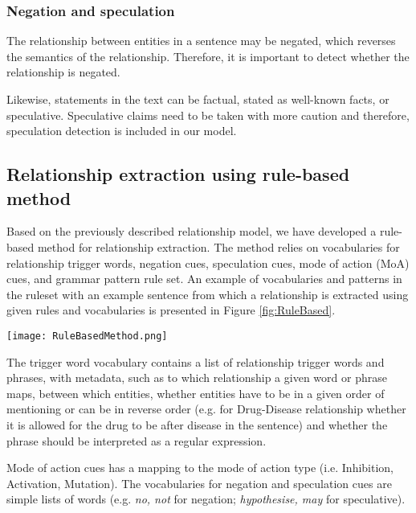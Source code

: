 \documentclass[final,12pt,3p,times,twocolumn,authoryear]{elsarticle}
\begin{document}
\subsubsection{Negation and speculation}

The relationship between entities in a sentence may be negated, which reverses the semantics of the relationship. Therefore, it is important to detect whether the relationship is negated.

Likewise, statements in the text can be factual, stated as well-known facts, or speculative. Speculative claims need to be taken with more caution and therefore, speculation detection is included in our model. 


\subsection{Relationship extraction using rule-based method}

Based on the previously described relationship model, we have developed a rule-based method for relationship extraction. The method relies on vocabularies for relationship trigger words, negation cues, speculation cues, mode of action (MoA) cues, and grammar pattern rule set. An example of vocabularies and patterns in the ruleset with an example sentence from which a relationship is extracted using given rules and vocabularies is presented in Figure \ref{fig:RuleBased}.

  \begin{figure*}[h]
\caption{Example of dictionaries, rules set and an example of sentence annotations in order to match relationship in a sentence}
\centering
\texttt{[image: RuleBasedMethod.png]}
\label{fig:RuleBased}
\end{figure*}

The trigger word vocabulary contains a list of relationship trigger words and phrases, with metadata, such as to which relationship a given word or phrase maps, between which entities, whether entities have to be in a given order of mentioning or can be in reverse order (e.g. for Drug-Disease relationship whether it is allowed for the drug to be after disease in the sentence) and whether the phrase should be interpreted as a regular expression.  


Mode of action cues has a mapping to the mode of action type (i.e. Inhibition, Activation, Mutation). The vocabularies for negation and speculation cues are simple lists of words (e.g. \textit{no, not} for negation; \textit{hypothesise, may} for speculative). 
\end{document}
